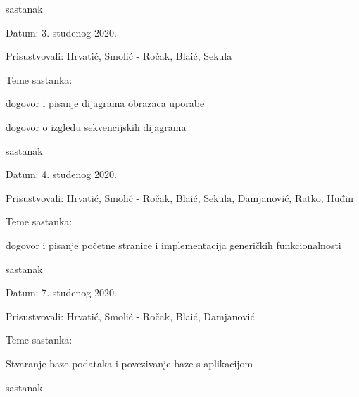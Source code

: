 \begin{packed_enum}
			\item  sastanak
			
			\item[] \begin{packed_item}
				\item Datum: 3. studenog 2020.
				\item Prisustvovali: Hrvatić, Smolić - Ročak, Blaić, Sekula
				\item Teme sastanka:
				\begin{packed_item}
					\item  dogovor i pisanje dijagrama obrazaca uporabe
					\item  dogovor o izgledu sekvencijskih dijagrama\newline
				\end{packed_item}
			\end{packed_item}
			
			\item  sastanak
			
			\item[] \begin{packed_item}
				\item Datum: 4. studenog 2020.
				\item Prisustvovali: Hrvatić, Smolić - Ročak, Blaić, Sekula, Damjanović, Ratko, Huđin
				\item Teme sastanka:
				\begin{packed_item}
					\item  dogovor i pisanje početne stranice i implementacija generičkih funkcionalnosti
				\end{packed_item}
			\end{packed_item}
			
			\item sastanak
			
			\item[] \begin{packed_item}
				\item Datum: 7. studenog 2020.
				\item Prisustvovali: Hrvatić, Smolić - Ročak, Blaić, Damjanović
				\item Teme sastanka:
				\begin{packed_item}
					\item  Stvaranje baze podataka i povezivanje baze s aplikacijom
				\end{packed_item}
			\end{packed_item}
			
			\item sastanak
			

\end{packed_enum}
